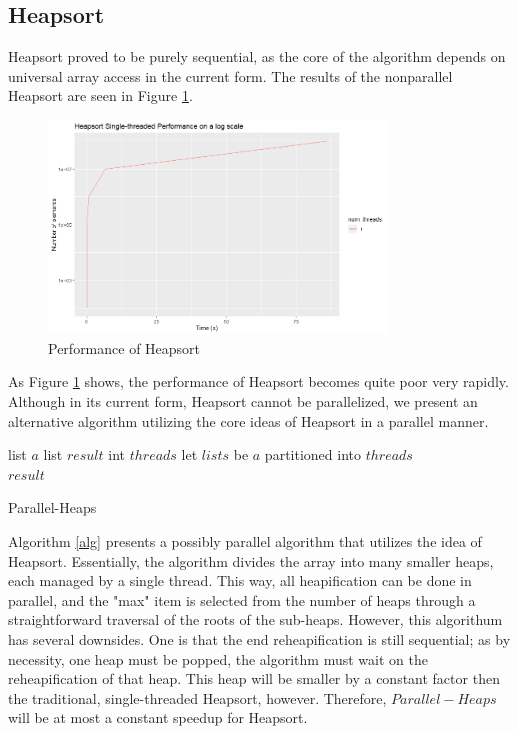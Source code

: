 \documentclass[conference]{IEEEtran}
\begin{document}
\subsection{Heapsort}
Heapsort proved to be purely sequential, as the core of the algorithm depends on universal array access in the current form. 
The results of the nonparallel Heapsort are seen in Figure \ref{hs_per}. 
\begin{figure}[h]
	\includegraphics[width=9cm]{hs_per.png} 
	\caption{Performance of Heapsort}
	\label{hs_per}
\end{figure}
As Figure \ref{hs_per} shows, the performance of Heapsort becomes quite poor very rapidly. 
Although in its current form, Heapsort cannot be parallelized, we present an alternative algorithm utilizing the core ideas of Heapsort in a parallel manner. 

\begin{algorithm}
	\SetAlgoLined
	list $a$\;
	list $result$\;
	int $threads$\;
	let $lists$ be $a$ partitioned into $threads$\\
	\Return $result$
	\caption{Parallel-Heaps}
	\label{alg}
\end{algorithm}
Algorithm \ref{alg} presents a possibly parallel algorithm that utilizes the idea of Heapsort. 
Essentially, the algorithm divides the array into many smaller heaps, each managed by a single thread. 
This way, all heapification can be done in parallel, and the "max" item is selected from the number of heaps through a straightforward traversal of the roots of the sub-heaps. 
However, this algorithum has several downsides. 
One is that the end reheapification is still sequential; as by necessity, one heap must be popped, the algorithm must wait on the reheapification of that heap. 
This heap will be smaller by a constant factor then the traditional, single-threaded Heapsort, however. 
Therefore, $Parallel-Heaps$ will be at most a constant speedup for Heapsort.
\end{document}
